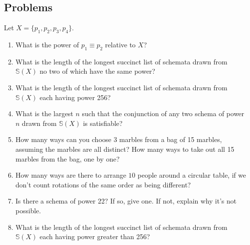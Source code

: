 \newpage
\begin{mdframed}[linewidth=1]
\section*{Problems}
Let $X = \{p_1, p_2, p_3, p_4\}$.  
\begin{enumerate}
    \item What is the power of $p_1 \equiv p_2$ relative to $X$?

    \item What is the length of the longest succinct list of schemata drawn from $\mathbb{S}(X)$ no two of which have the same power?

    \item What is the length of the longest succinct list of schemata drawn from $\mathbb{S}(X)$ each having power 256?

    \item What is the largest $n$ such that the conjunction of any two schema of power $n$ drawn from $\mathbb{S}(X)$ is satisfiable?

    \item How many ways can you choose 3 marbles from a bag of 15 marbles, assuming the marbles are all distinct? How many ways to take out all 15 marbles from the bag, one by one? 

    \item How many ways are there to arrange $10$ people around a circular table, if we don't count rotations of the same order as being different?

    \item Is there a schema of power 22? If so, give one. If not, explain why it's not possible.

    \item What is the length of the longest succinct list of schemata drawn from $\mathbb{S}(X)$ each having power greater than 256?
\end{enumerate}
\end{mdframed}

